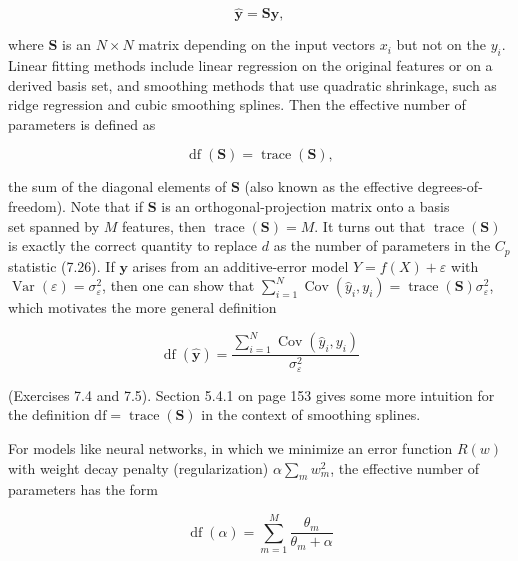 \documentclass[10pt]{article}
\begin{document}
\begin{equation*}
\hat{\mathbf{y}}=\mathbf{S y}, \tag{7.31}
\end{equation*}


where $\mathbf{S}$ is an $N \times N$ matrix depending on the input vectors $x_{i}$ but not on the $y_{i}$. Linear fitting methods include linear regression on the original features or on a derived basis set, and smoothing methods that use quadratic shrinkage, such as ridge regression and cubic smoothing splines. Then the effective number of parameters is defined as


\begin{equation*}
\operatorname{df}(\mathbf{S})=\operatorname{trace}(\mathbf{S}), \tag{7.32}
\end{equation*}


the sum of the diagonal elements of $\mathbf{S}$ (also known as the effective degrees-of-freedom). Note that if $\mathbf{S}$ is an orthogonal-projection matrix onto a basis\\
set spanned by $M$ features, then $\operatorname{trace}(\mathbf{S})=M$. It turns out that $\operatorname{trace}(\mathbf{S})$ is exactly the correct quantity to replace $d$ as the number of parameters in the $C_{p}$ statistic (7.26). If $\mathbf{y}$ arises from an additive-error model $Y=f(X)+\varepsilon$ with $\operatorname{Var}(\varepsilon)=\sigma_{\varepsilon}^{2}$, then one can show that $\sum_{i=1}^{N} \operatorname{Cov}\left(\hat{y}_{i}, y_{i}\right)=\operatorname{trace}(\mathbf{S}) \sigma_{\varepsilon}^{2}$, which motivates the more general definition


\begin{equation*}
\operatorname{df}(\hat{\mathbf{y}})=\frac{\sum_{i=1}^{N} \operatorname{Cov}\left(\hat{y}_{i}, y_{i}\right)}{\sigma_{\varepsilon}^{2}} \tag{7.33}
\end{equation*}


(Exercises 7.4 and 7.5). Section 5.4.1 on page 153 gives some more intuition for the definition $\mathrm{df}=\operatorname{trace}(\mathbf{S})$ in the context of smoothing splines.

For models like neural networks, in which we minimize an error function $R(w)$ with weight decay penalty (regularization) $\alpha \sum_{m} w_{m}^{2}$, the effective number of parameters has the form


\begin{equation*}
\operatorname{df}(\alpha)=\sum_{m=1}^{M} \frac{\theta_{m}}{\theta_{m}+\alpha} \tag{7.34}
\end{equation*}
\end{document}
